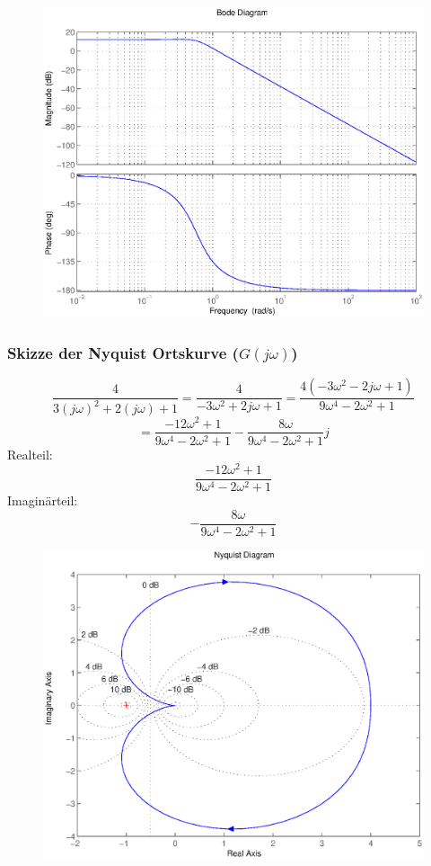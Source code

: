 \documentclass[a4paper,10pt,fleqn]{article}
\begin{document}
\begin{figure}[h!]
\center
\includegraphics[width=\textwidth]{bode.eps}
\end{figure}

\subsubsection*{Skizze der Nyquist Ortskurve ($G(j\omega)$)}
\[ \frac{4}{3(j\omega)^2 + 2(j\omega) + 1} = \frac{4}{-3 \omega^2 + 2 j \omega + 1} 
= \frac{4 (-3 \omega^2 - 2 j \omega + 1)}{9 \omega^4 - 2 \omega^2  + 1} \]
\[ = \frac{-12 \omega^2 + 1}{9 \omega^4 - 2 \omega^2 + 1} - \frac{8 \omega}{9 \omega^4 - 2 \omega^2 + 1}j \]
Realteil: 
\[  \frac{-12 \omega^2 + 1}{9 \omega^4 - 2 \omega^2 + 1} \]
Imaginärteil: 
\[ - \frac{8 \omega}{9 \omega^4 - 2 \omega^2 + 1} \]
\begin{figure}[h!]
\center
\includegraphics[width=\textwidth]{nyquist.eps}
\end{figure}
\end{document}
